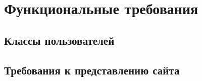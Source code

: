 \section{Функциональные требования}
\subsection{Классы пользователей}

\subsection{Требования к представлению сайта}
